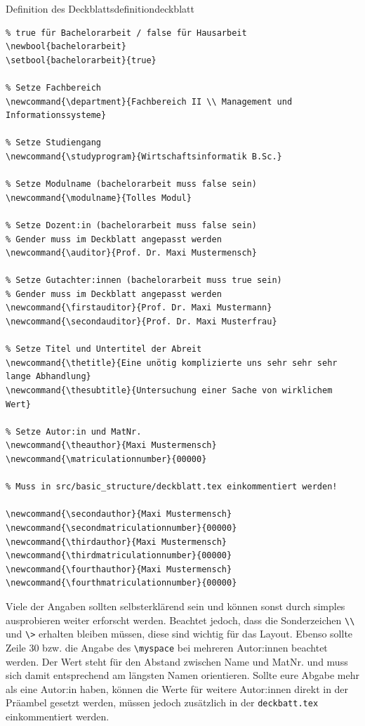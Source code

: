 \begin{code}{Definition des Deckblatts}{definitiondeckblatt}
	\begin{verbatim}
% true für Bachelorarbeit / false für Hausarbeit
\newbool{bachelorarbeit}
\setbool{bachelorarbeit}{true}

% Setze Fachbereich
\newcommand{\department}{Fachbereich II \\ Management und Informationssysteme}

% Setze Studiengang
\newcommand{\studyprogram}{Wirtschaftsinformatik B.Sc.}

% Setze Modulname (bachelorarbeit muss false sein)
\newcommand{\modulname}{Tolles Modul}

% Setze Dozent:in (bachelorarbeit muss false sein)
% Gender muss im Deckblatt angepasst werden
\newcommand{\auditor}{Prof. Dr. Maxi Mustermensch}

% Setze Gutachter:innen (bachelorarbeit muss true sein)
% Gender muss im Deckblatt angepasst werden
\newcommand{\firstauditor}{Prof. Dr. Maxi Mustermann}
\newcommand{\secondauditor}{Prof. Dr. Maxi Musterfrau}

% Setze Titel und Untertitel der Abreit
\newcommand{\thetitle}{Eine unötig komplizierte uns sehr sehr sehr lange Abhandlung}
\newcommand{\thesubtitle}{Untersuchung einer Sache von wirklichem Wert}

% Setze Autor:in und MatNr.
\newcommand{\theauthor}{Maxi Mustermensch}
\newcommand{\matriculationnumber}{00000}

% Muss in src/basic_structure/deckblatt.tex einkommentiert werden!

\newcommand{\secondauthor}{Maxi Mustermensch}
\newcommand{\secondmatriculationnumber}{00000}
\newcommand{\thirdauthor}{Maxi Mustermensch}
\newcommand{\thirdmatriculationnumber}{00000}
\newcommand{\fourthauthor}{Maxi Mustermensch}
\newcommand{\fourthmatriculationnumber}{00000}

	\end{verbatim}
\end{code}

Viele der Angaben sollten selbsterklärend sein und können sonst durch simples
ausprobieren weiter erforscht werden. Beachtet jedoch, dass die Sonderzeichen
\texttt{\textbackslash \textbackslash} und \texttt{\textbackslash>} erhalten
bleiben müssen, diese sind wichtig für das Layout. Ebenso sollte Zeile 30 bzw.
die Angabe des \texttt{\textbackslash myspace} bei mehreren Autor:innen beachtet
werden. Der Wert steht für den Abstand zwischen Name und MatNr. und muss sich
damit entsprechend am längsten Namen orientieren. Sollte eure Abgabe mehr als
eine Autor:in haben, können die Werte für weitere Autor:innen direkt in der
Präambel gesetzt werden, müssen jedoch zusätzlich in der \texttt{deckbatt.tex}
einkommentiert werden.

